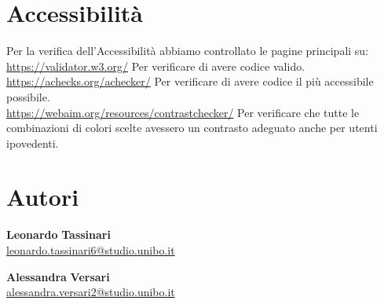 \section{Accessibilità}
Per la verifica dell'Accessibilità abbiamo controllato le pagine principali su:\\
\href{https://validator.w3.org/}{https://validator.w3.org/} Per verificare di avere codice valido.\\
\href{https://achecks.org/achecker/}{https://achecks.org/achecker/} Per verificare di avere codice il più accessibile possibile.\\
\href{https://webaim.org/resources/contrastchecker/}{https://webaim.org/resources/contrastchecker/} Per verificare che tutte le combinazioni di colori scelte avessero un contrasto adeguato anche per utenti ipovedenti.
\section{Autori}
\begin{minipage}[t]{0.4\textwidth}
    \textbf{Leonardo} \textbf{Tassinari}\\
    \href{mailto:leonardo.tassinari6@studio.unibo.it}{leonardo.tassinari6@studio.unibo.it}
\end{minipage}%
\hfill
\begin{minipage}[t]{0.3\textwidth}
\end{minipage}
\begin{minipage}[t]{0.4\textwidth}
    \textbf{Alessandra} \textbf{Versari}\\
    \href{mailto:alessandra.versari2@studio.unibo.it}{alessandra.versari2@studio.unibo.it}
\end{minipage}%
\hfill
\begin{minipage}[t]{0.3\textwidth}
\end{minipage}